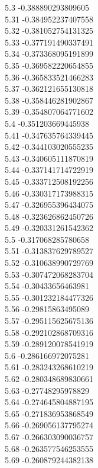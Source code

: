 {5.3	-0.388890293809605\\
5.31	-0.384952237407558\\
5.32	-0.381052754131325\\
5.33	-0.377191490337491\\
5.34	-0.373368095191899\\
5.35	-0.369582220654855\\
5.36	-0.365833521466283\\
5.37	-0.362121655130818\\
5.38	-0.358446281902867\\
5.39	-0.354807064771602\\
5.4	-0.351203669445938\\
5.41	-0.347635764339445\\
5.42	-0.344103020555235\\
5.43	-0.340605111870819\\
5.44	-0.337141714722919\\
5.45	-0.333712508192256\\
5.46	-0.330317173988315\\
5.47	-0.326955396434075\\
5.48	-0.323626862450726\\
5.49	-0.320331261542362\\
5.5	-0.317068285780658\\
5.51	-0.313837629789527\\
5.52	-0.310638990729769\\
5.53	-0.307472068283704\\
5.54	-0.30433656463981\\
5.55	-0.301232184477326\\
5.56	-0.29815863495089\\
5.57	-0.295115625675136\\
5.58	-0.292102868709316\\
5.59	-0.289120078541919\\
5.6	-0.286166972075281\\
5.61	-0.283243268610219\\
5.62	-0.280348689830661\\
5.63	-0.27748295978829\\
5.64	-0.274645804887195\\
5.65	-0.271836953868549\\
5.66	-0.269056137795274\\
5.67	-0.266303090036757\\
5.68	-0.263577546253555\\
5.69	-0.260879244382138\\
}
